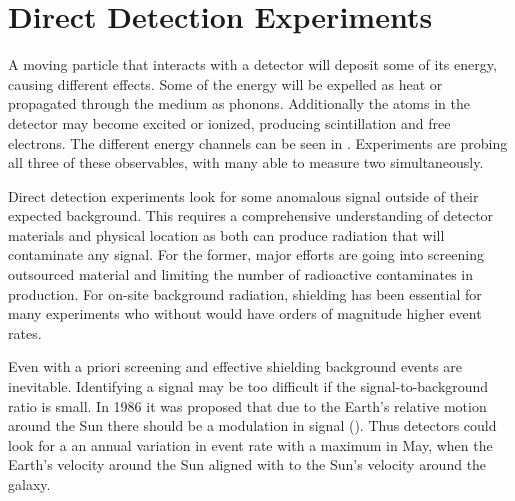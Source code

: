 






 \section[Direct Detection Experiments][Direct Detection Experiments]{Direct Detection Experiments}
 A moving particle that interacts with a detector will deposit some of its energy, causing different effects.  Some of the energy
 will be expelled as heat or propagated through the medium as phonons.  Additionally the atoms in the detector may become
 excited or ionized, producing scintillation and free electrons.  The different energy channels can be seen in
 .  Experiments are probing all three of these observables, with many able to measure two
 simultaneously.
 
 Direct detection experiments look for some anomalous signal outside of their expected background.  This requires a comprehensive
 understanding of detector materials and physical location as both can produce radiation that will contaminate any signal.  For the
 former, major efforts are going into screening outsourced material and limiting the number of radioactive contaminates in
 production.  For on-site background radiation, shielding has been essential for many experiments who without would have orders
 of magnitude higher event rates.
 
 Even with a priori screening and effective shielding background events are inevitable.  Identifying a signal may be too
 difficult if the signal-to-background ratio is small.  In 1986 it was proposed
 that due to the Earth's relative motion around the Sun there should be a modulation in signal ().  Thus
 detectors could look for a an annual variation in event rate with a maximum in May, when the Earth's velocity around the
 Sun aligned with to the Sun's velocity around the galaxy.
 
 
 \begin{figure}
  \label{fig:energy_channels}
 \end{figure}
 
